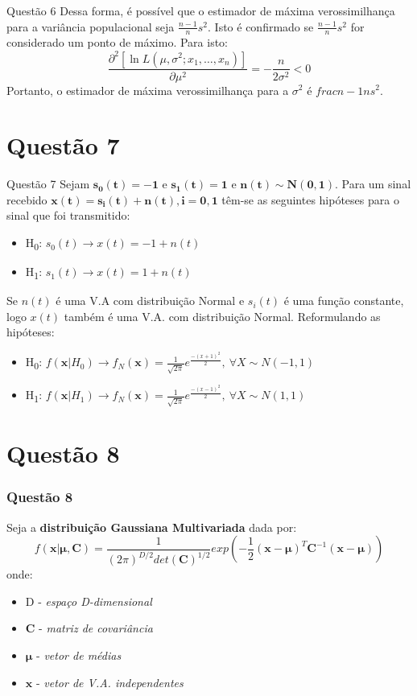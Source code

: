 \documentclass{beamer}\usepackage[]{graphicx}\usepackage[]{color}
\begin{document}
		\begin{frame}{Questão 6}
			Dessa forma, é possível que o estimador de máxima verossimilhança para a variância populacional seja $ \frac{n-1}{n}s^{2}$.  Isto é confirmado se $ \frac{n-1}{n}s^{2}$ for considerado um ponto de máximo.  Para isto:
			$$\frac{\partial^{2}[ \ln   L(\mu,\sigma^{2};x_{1},\dots,x_{n})]}{\partial \mu^{2}}  = -\frac{n}{2\sigma^2} < 0 $$
			Portanto, o estimador de máxima verossimilhança para a $\sigma^{2}$ é $frac{n-1}{n}s^{2}$.
		\end{frame}
	\section{Questão 7}
		\begin{frame}{Questão 7}
			Sejam $\boldsymbol{s_{0}(t) = -1}$ e $\boldsymbol{s_{1}(t) = 1}$ e $\boldsymbol{n(t)\sim N(0,1)}$.  Para um sinal recebido $\boldsymbol{x(t) = s_{i}(t) + n(t), i={0,1}}$ têm-se as seguintes hipóteses para o sinal que foi transmitido:
			\begin{itemize}
				\item H\textsubscript{0}:  $s_{0}(t) \rightarrow x(t) = -1 + n(t)$
				\item H\textsubscript{1}:  $s_{1}(t) \rightarrow x(t) = 1 + n(t)$
			\end{itemize}
			Se $n(t)$ é uma V.A com distribuição Normal e $s_{i}(t)$ é uma função constante, logo $x(t)$ também é uma V.A. com distribuição Normal.  Reformulando as hipóteses:
			\begin{itemize}
				\item H\textsubscript{0}:  $f(\boldsymbol{x}|H_{0}) \rightarrow f_{N}(\boldsymbol{x}) = \frac{1}{\sqrt{2\pi}}e^{\frac{-(x+1)^{2}}{2}},~ \forall X \sim N(-1,1)$
				\item H\textsubscript{1}:   $f(\boldsymbol{x}|H_{1}) \rightarrow f_{N}(\boldsymbol{x}) = \frac{1}{\sqrt{2\pi}}e^{\frac{-(x-1)^{2}}{2}},~ \forall X \sim N(1,1)$
			\end{itemize}
		\end{frame}
	\section{Questão 8}
		\begin{frame}
			\frametitle{Questão 8}
			Seja a \textbf{distribuição Gaussiana Multivariada} dada por:$$f(\boldsymbol{x} \lvert \boldsymbol{\mu, C}) = \frac{1}{(2\pi)^{D/2}det(\boldsymbol{C})^{1/2}}exp(-\frac{1}{2}(\boldsymbol{x} - \boldsymbol{\mu})^{T}\boldsymbol{C}^{-1}(\boldsymbol{x} - \boldsymbol{\mu}))$$
			onde:
			\begin{itemize}
				\item D - \textit{espaço D-dimensional}
				\item \textbf{C} - \textit{matriz de covariância}
				\item $\boldsymbol{\mu}$ - \textit{vetor de médias}
				\item $\boldsymbol{x}$ - \textit{vetor de V.A. independentes}
			\end{itemize}
		\end{frame}
		
\end{document}
